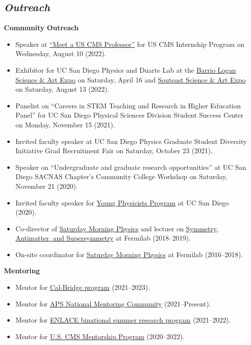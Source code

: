 \documentclass[11pt]{res}
\newcommand{\MarginText}[1]{\section{\textit{#1}}}
\begin{document}
\begin{resume}
  \MarginText{Outreach}
  \textbf{Community Outreach}
  \begin{itemize}
    \itemsep-0.3em
    \item Speaker at \href{https://indico.cern.ch/event/1167965/timetable/#93-meet-a-uscms-professorscien}{``Meet a US CMS Professor''} for US CMS Internship Program on Wednesday, August 10 (2022).
    \item Exhibitor for UC San Diego Physics and Duarte Lab at the \href{https://www.barriologansae.com/}{Barrio Logan Science \& Art Expo} on Saturday, April 16 and \href{https://www.southeastsdsteamexpo.com/}{Souteast Science \& Art Expo} on Saturday, August 13 ({2022}).
    \item Panelist on ``Careers in STEM Teaching and Research in Higher Education Panel'' for UC San Diego Physical Sciences Division Student Success Center on Monday, November 15 ({2021}).
    \item Invited faculty speaker at UC San Diego Physics Graduate Student Diversity Initiative Grad Recruitment Fair on Saturday, October 23 ({2021}).
    \item Speaker on ``Undergraduate and graduate research opportunities'' at UC San Diego SACNAS Chapter's Community College Workshop on Saturday, November 21 ({2020}).
    \item Invited faculty speaker for \href{http://ypp.ucsd.edu/}{Young Physicists Program} at UC San Diego ({2020}).
    \item Co-director of \href{http://saturdaymorningphysics.fnal.gov/}{Saturday Morning Physics} and lectuer on \href{http://saturdaymorningphysics.fnal.gov/fall-session-2018/}{Symmetry, Antimatter, and Supersymmetry} at Fermilab ({2018--2019}).
    \item On-site coordinator for \href{http://saturdaymorningphysics.fnal.gov/}{Saturday Morning Physics} at Fermilab ({2016--2018}).
  \end{itemize}

  \textbf{Mentoring}
  \begin{itemize}
    \itemsep-0.3em
    \item Mentor for \href{https://www.cpp.edu/calbridge/index.shtml}{Cal-Bridge program} ({2021--2023}).
    \item Mentor for \href{https://aps.org/programs/minorities/nmc/}{APS National Mentoring Community} (2021--Present).
    \item Mentor for \href{http://resilientmaterials.ucsd.edu/ENLACE}{ENLACE binational summer research program} ({2021--2022}).
    \item Mentor for \href{https://uscms-diversity-equity-inclusion.github.io/mentorship.html}{U.S. CMS Mentorship Program} ({2020--2022}).
  \end{itemize}


\end{resume}
\end{document}
